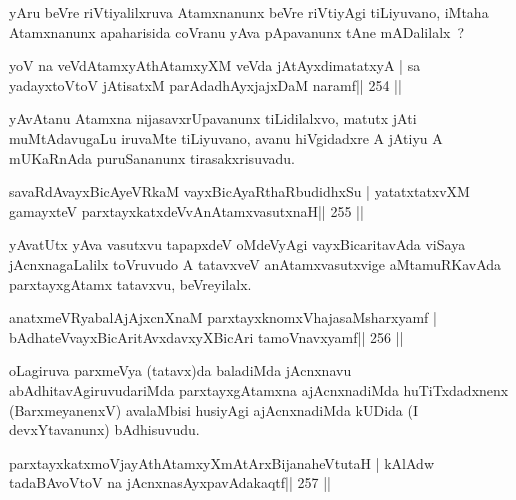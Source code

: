 \begin{artha}
yAru beVre riVtiyalilxruva Atamxnanunx beVre riVtiyAgi tiLiyuvano, iMtaha Atamxnanunx apaharisida coVranu yAva pApavanunx tAne mADalilalx~?
\end{artha}


\begin{shl}
yoV na veVdA\s\s tamxyAthAtamxyXM veVda jAtAyxdimatatxyA |
sa yadayxtoV\s toV jAtisatxM parAdadhAyxjajxDaM naramf\hfill || 254 ||
\end{shl}

\begin{artha}
yAvAtanu Atamxna nijasavxrUpavanunx tiLidilalxvo, matutx jAti muMtAdavugaLu iruvaMte tiLiyuvano, avanu hiVgidadxre A jAtiyu A mUKaRnAda puruSananunx tirasakxrisuvadu.
\end{artha}


\begin{shl}
savaRdA\s vayxBicAyeVRkaM vayxBicAyaRthaRbudidhxSu |
yatatxtatxvXM gamayxteV parxtayxkatxdeVvAnAtamxvasutxnaH\hfill || 255 ||
\end{shl}

\begin{artha}
yAvatUtx yAva vasutxvu tapapxdeV oMdeVyAgi vayxBicaritavAda viSaya jAcnxnagaLalilx toVruvudo A tatavxveV anAtamxvasutxvige aMtamuRKavAda parxtayxgAtamx tatavxvu, beVreyilalx.
\end{artha}


\begin{shl}
anatxmeVRyabalAjAjxcnXnaM parxtayxknomxVhajasaMsharxyamf |
bAdhateV\s vayxBicAritAvxdavxyXBicAri tamoVnavxyamf\hfill || 256 ||
\end{shl}

\begin{artha}
oLagiruva parxmeVya (tatavx)da baladiMda jAcnxnavu abAdhitavAgiruvudariMda parxtayxgAtamxna ajAcnxnadiMda huTiTxdadxnenx (BarxmeyanenxV) avalaMbisi husiyAgi ajAcnxnadiMda kUDida (I devxYtavanunx) bAdhisuvudu.
\end{artha}

\begin{shl}
parxtayxkatxmoVjayAthAtamxyXmAtArxBijanaheVtutaH |
kAlAdw tadaBAvoV\s toV na jAcnxnasAyxpavAdakaqtf\hfill || 257 ||
\end{shl}

